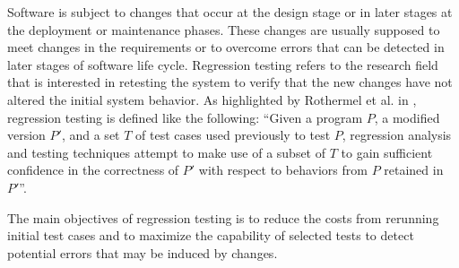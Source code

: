 Software is subject to changes that occur at the design stage or in later stages at the deployment or maintenance phases. These changes are 
usually supposed to meet changes in the requirements or to overcome errors that can be detected in later stages of software life cycle. 
Regression testing refers to the research field that is interested in retesting the system to verify that the new changes have not altered 
the initial system behavior. As highlighted by Rothermel et al. in \cite{Rothermel:1996:ART:235681.235682}, regression testing is defined like the 
following: 
``Given a program $P$, a modified version $P'$, and a set $T$ of test cases used previously to test $P$, regression analysis and testing 
techniques attempt to make use of a subset of $T$ to gain sufficient confidence in the correctness of $P'$ with respect to behaviors from $P$ retained 
in $P'$''.

The main objectives of regression testing is to reduce the costs from rerunning initial test cases and to maximize the capability of 
selected tests to detect potential errors that may be induced by changes.

